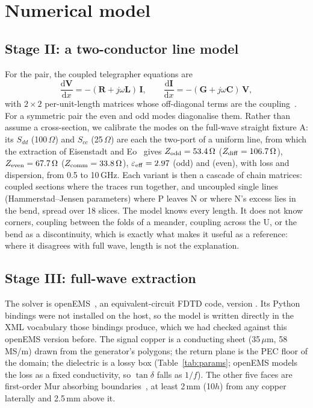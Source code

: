 \documentclass[10pt,twocolumn]{article}
\newcommand{\Sdd}[1]{S_{dd#1}}
\newcommand{\Scc}[1]{S_{cc#1}}
\newcommand{\eeff}{\varepsilon_{\mathrm{eff}}}
\begin{document}
\section{Numerical model}
\label{sec:model}

\subsection{Stage II: a two-conductor line model}

For the pair, the coupled telegrapher equations are
\begin{equation}
  \frac{\mathrm{d}\mathbf{V}}{\mathrm{d}x} = -(\mathbf{R} + j\omega\mathbf{L})\,\mathbf{I}, \qquad
  \frac{\mathrm{d}\mathbf{I}}{\mathrm{d}x} = -(\mathbf{G} + j\omega\mathbf{C})\,\mathbf{V},
  \label{eq:telegrapher}
\end{equation}
with $2\times2$ per-unit-length matrices whose off-diagonal terms are the coupling~\cite{paul_mtl}. For a
symmetric pair the even and odd modes diagonalise them. Rather than assume a cross-section, we calibrate the modes
on the full-wave straight fixture A: its $\Sdd{}$ (100\,$\Omega$) and $\Scc{}$ (25\,$\Omega$) are each the
two-port of a uniform line, from which the extraction of Eisenstadt and Eo~\cite{eisenstadt1992} gives
$Z_\mathrm{odd} = 53.4\,\Omega$ ($Z_\mathrm{diff} = 106.7\,\Omega$), $Z_\mathrm{even} = 67.7\,\Omega$
($Z_\mathrm{comm} = 33.8\,\Omega$), $\eeff = \EpsOdd$ (odd) and \EpsEven{} (even), with loss and dispersion,
from 0.5 to 10\,GHz. Each variant is then a cascade of chain matrices: coupled sections where the traces run
together, and uncoupled single lines (Hammerstad--Jensen parameters) where P leaves N or where N's excess lies in
the bend, spread over 18 slices. The model knows every length. It does not know corners, coupling between the
folds of a meander, coupling across the U, or the bend as a discontinuity, which is exactly what makes it useful
as a reference: where it disagrees with full wave, length is not the explanation.

\subsection{Stage III: full-wave extraction}

The solver is openEMS~\cite{openems_intro,liebig2013}, an equivalent-circuit FDTD code, version
\texttt{\SolverVersion}. Its Python bindings were not installed on the host, so the model is written directly in
the XML vocabulary those bindings produce, which we had checked against this openEMS version before. The
signal copper is a conducting sheet (35\,$\mu$m, 58\,MS/m) drawn from the generator's polygons; the return plane is
the PEC floor of the domain; the dielectric is a lossy box (Table~\ref{tab:params}; openEMS models the loss as a
fixed conductivity, so $\tan\delta$ falls as $1/f$). The other five faces are first-order Mur absorbing
boundaries~\cite{mur1981}, at least 2\,mm (10$h$) from any copper laterally and 2.5\,mm above it.
\end{document}
